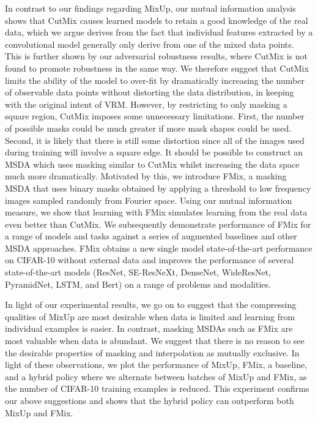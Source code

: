 \documentclass[journal]{IEEEtran}
\newcommand{\fmix}{FMix\xspace}
\newcommand{\mixup}{MixUp\xspace}
\newcommand{\cutmix}{CutMix\xspace}
\begin{document}
In contrast to our findings regarding \mixup, our mutual information analysis shows that \cutmix causes learned models to retain a good knowledge of the real data, which we argue derives from the fact that individual features extracted by a convolutional model generally only derive from one of the mixed data points. This is further shown by our adversarial robustness results, where \cutmix is not found to promote robustness in the same way. We therefore suggest that \cutmix limits the ability of the model to over-fit by dramatically increasing the number of observable data points without distorting the data distribution,
in keeping with the original intent of VRM.
However, by restricting to only masking a square region, \cutmix imposes some unnecessary limitations. First, the number of possible masks could be much greater if more mask shapes could be used. Second, it is likely that there is still some distortion since all of the images used during training will involve a square edge.
It should be possible to construct an MSDA which uses masking similar to \cutmix whilst increasing the data space much more dramatically.
Motivated by this, we introduce \fmix, a masking MSDA that uses binary masks obtained by applying a threshold to low frequency images sampled randomly from Fourier space.
Using our mutual information measure, we show that learning with \fmix simulates learning from the real data even better than \cutmix. 
We subsequently demonstrate performance of \fmix for a range of models and tasks against a series of augmented baselines and other MSDA approaches.
\fmix obtains a new single model state-of-the-art performance on CIFAR-10 \citep{krizhevsky2009learning} without external data and improves the performance of several state-of-the-art models (ResNet, SE-ResNeXt, DenseNet, WideResNet, PyramidNet, LSTM, and Bert) on a range of problems and modalities.

In light of our experimental results, we go on to suggest that the compressing qualities of \mixup are most desirable when data is limited and learning from individual examples is easier. In contrast, masking MSDAs such as \fmix are most valuable when data is abundant.
We suggest that there is no reason to see the desirable properties of masking and interpolation as mutually exclusive. In light of these observations, we plot the performance of \mixup, \fmix, a baseline, and a hybrid policy where we alternate between batches of \mixup and \fmix, as the number of CIFAR-10 training examples is reduced. This experiment confirms our above suggestions and shows that the hybrid policy can outperform both \mixup and \fmix.
\end{document}
